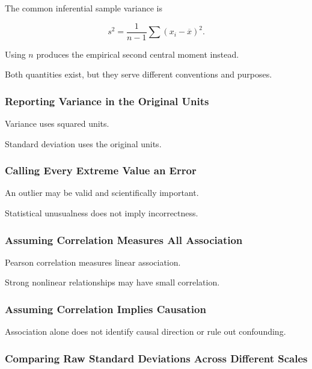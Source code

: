 The common inferential sample variance is

\[
\boxed{
s^2
=
\frac1{n-1}
\sum
(x_i-\overline{x})^2.
}
\]

Using \(n\) produces the empirical second central moment instead.

Both quantities exist, but they serve different conventions and
purposes.

\subsubsection{Reporting Variance in the Original Units}

Variance uses squared units.

Standard deviation uses the original units.

\subsubsection{Calling Every Extreme Value an Error}

An outlier may be valid and scientifically important.

Statistical unusualness does not imply incorrectness.

\subsubsection{Assuming Correlation Measures All Association}

Pearson correlation measures linear association.

Strong nonlinear relationships may have small correlation.

\subsubsection{Assuming Correlation Implies Causation}

Association alone does not identify causal direction or rule out
confounding.

\subsubsection{Comparing Raw Standard Deviations Across Different Scales}

